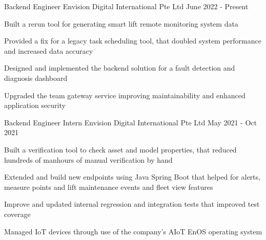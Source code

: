 

\begin{cventries}

  \cventry
    {Backend Engineer} %
    {Envision Digital International Pte Ltd} %
    {} %
    {June 2022 - Present} %
    {
      \begin{cvitems} %
        \item {Built a rerun tool for generating smart lift remote monitoring system data}
        \item {Provided a fix for a legacy task scheduling tool, that doubled system performance and increased data accuracy}
        \item {Designed and implemented the backend solution for a fault detection and diagnosis dashboard}
        \item {Upgraded the team gateway service improving maintainability and enhanced application security}
      \end{cvitems}
    }

  \cventry
    {Backend Engineer Intern} %
    {Envision Digital International Pte Ltd} %
    {} %
    {May 2021 - Oct 2021} %
    {
      \begin{cvitems} %
        \item {Built a verification tool to check asset and model properties, that reduced hundreds of manhours of manual verification by hand}
        \item {Extended and build new endpoints using Java Spring Boot that helped for alerts, measure points and lift maintenance events and fleet view features}
        \item {Improve and updated internal regression and integration tests that improved test coverage}
        \item {Managed IoT devices through use of the company's AIoT EnOS operating system}
      \end{cvitems}
    }


\end{cventries}
